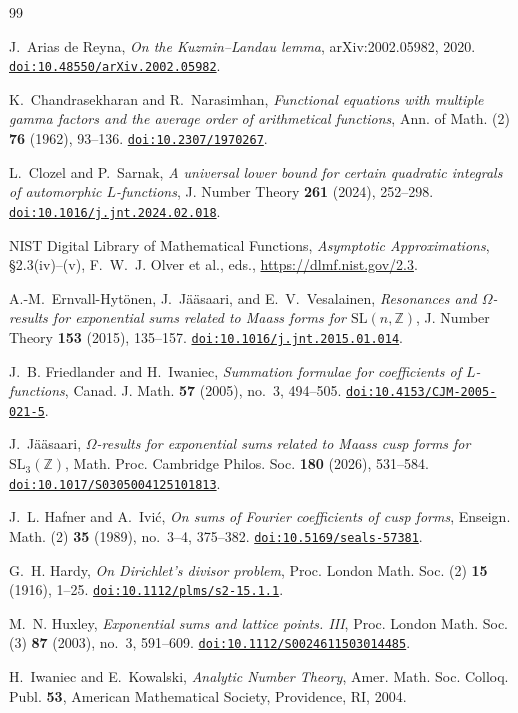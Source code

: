 \documentclass[11pt]{amsart}
\theoremstyle{plain}
\theoremstyle{definition}
\theoremstyle{remark}
\newcommand{\doi}[1]{\href{https://doi.org/#1}{\nolinkurl{doi:#1}}}
\numberwithin{equation}{section}
\begin{document}
\begin{thebibliography}{99}

J.~Arias de Reyna,
\emph{On the Kuzmin--Landau lemma},
arXiv:2002.05982, 2020.
\doi{10.48550/arXiv.2002.05982}.

K.~Chandrasekharan and R.~Narasimhan,
\emph{Functional equations with multiple gamma factors and the average order of arithmetical functions},
Ann. of Math. (2) \textbf{76} (1962), 93--136.
\doi{10.2307/1970267}.

L.~Clozel and P.~Sarnak,
\emph{A universal lower bound for certain quadratic integrals of automorphic $L$-functions},
J. Number Theory \textbf{261} (2024), 252--298.
\doi{10.1016/j.jnt.2024.02.018}.

NIST Digital Library of Mathematical Functions,
\emph{Asymptotic Approximations}, \S2.3(iv)--(v),
F.~W.~J. Olver et al., eds.,
\url{https://dlmf.nist.gov/2.3}.

A.-M.~Ernvall-Hyt\"onen, J.~J\"a\"asaari, and E.~V.~Vesalainen,
\emph{Resonances and $\Omega$-results for exponential sums related to
Maass forms for $\mathrm{SL}(n,\mathbb Z)$},
J. Number Theory \textbf{153} (2015), 135--157.
\doi{10.1016/j.jnt.2015.01.014}.

J.~B. Friedlander and H.~Iwaniec,
\emph{Summation formulae for coefficients of $L$-functions},
Canad. J. Math. \textbf{57} (2005), no.~3, 494--505.
\doi{10.4153/CJM-2005-021-5}.


J.~J\"a\"asaari,
\emph{$\Omega$-results for exponential sums related to Maass cusp
forms for $\mathrm{SL}_3(\mathbb Z)$},
Math. Proc. Cambridge Philos. Soc. \textbf{180} (2026), 531--584.
\doi{10.1017/S0305004125101813}.


J.~L. Hafner and A.~Ivi\'c,
\emph{On sums of Fourier coefficients of cusp forms},
Enseign. Math. (2) \textbf{35} (1989), no.~3--4, 375--382.
\doi{10.5169/seals-57381}.

G.~H. Hardy,
\emph{On Dirichlet's divisor problem},
Proc. London Math. Soc. (2) \textbf{15} (1916), 1--25.
\doi{10.1112/plms/s2-15.1.1}.

M.~N. Huxley,
\emph{Exponential sums and lattice points. III},
Proc. London Math. Soc. (3) \textbf{87} (2003), no.~3, 591--609.
\doi{10.1112/S0024611503014485}.

H.~Iwaniec and E.~Kowalski,
\emph{Analytic Number Theory},
Amer. Math. Soc. Colloq. Publ. \textbf{53},
American Mathematical Society, Providence, RI, 2004.


\end{thebibliography}
\end{document}
